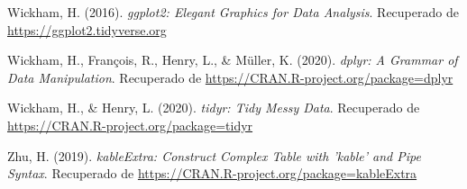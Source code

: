 \documentclass[
  english]{revcoles}
\begin{document}
\leavevmode\hypertarget{ref-ggplot2}{}%
Wickham, H. (2016). \emph{ggplot2: Elegant Graphics for Data Analysis}.
Recuperado de \url{https://ggplot2.tidyverse.org}

\leavevmode\hypertarget{ref-dplyr}{}%
Wickham, H., François, R., Henry, L., \& Müller, K. (2020). \emph{dplyr:
A Grammar of Data Manipulation}. Recuperado de
\url{https://CRAN.R-project.org/package=dplyr}

\leavevmode\hypertarget{ref-tidyr}{}%
Wickham, H., \& Henry, L. (2020). \emph{tidyr: Tidy Messy Data}.
Recuperado de \url{https://CRAN.R-project.org/package=tidyr}

\leavevmode\hypertarget{ref-kableExtra}{}%
Zhu, H. (2019). \emph{kableExtra: Construct Complex Table with 'kable'
and Pipe Syntax}. Recuperado de
\url{https://CRAN.R-project.org/package=kableExtra}
\end{document}
